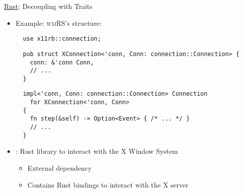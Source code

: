 \begin{frame}[fragile]{\underline{Rust}: Decoupling with Traits \hfill {\footnotesize \currentname}}


    \begin{itemize}

        \item Example: \textsc{wmRS}'s  structure:\\
\begin{verbatim}
  use x11rb::connection;
\end{verbatim}
\begin{verbatim}
  pub struct XConnection<'conn, Conn: connection::Connection> {
    conn: &'conn Conn,
    // ...
  }
\end{verbatim}
\begin{verbatim}
  impl<'conn, Conn: connection::Connection> Connection
    for XConnection<'conn, Conn>
  {
    fn step(&self) -> Option<Event> { /* ... */ }
    // ...
  }
\end{verbatim}

        \item {}: Rust library to interact with the X Window System\\
            \begin{itemize}
                \item External dependency
                \item Contains Rust bindings to interact with the X server
            \end{itemize}

    \end{itemize}

    \vfill

\end{frame}


